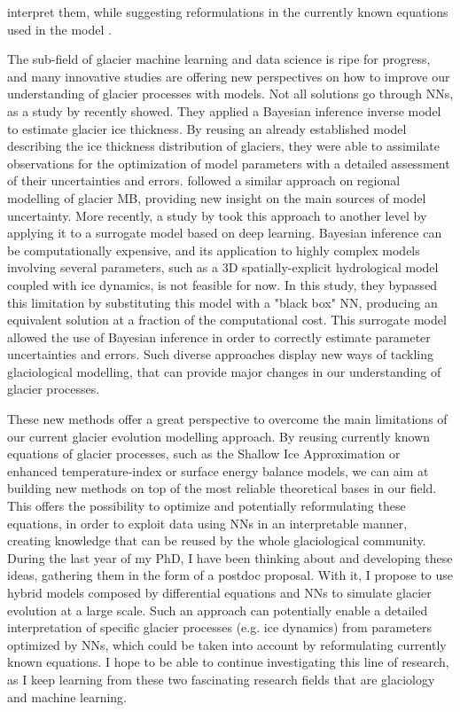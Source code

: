 interpret them, while suggesting reformulations in the currently known equations used in the model \citep{rackauckas_universal_2020}. 

The sub-field of glacier machine learning and data science is ripe for progress, and many innovative studies are offering new perspectives on how to improve our understanding of glacier processes with models. Not all solutions go through NNs, as a study by \citet{werder_bayesian_2019} recently showed. They applied a Bayesian inference inverse model to estimate glacier ice thickness. By reusing an already established model describing the ice thickness distribution of glaciers, they were able to assimilate observations for the optimization of model parameters with a detailed assessment of their uncertainties and errors. \citet{rounce_quantifying_2020} followed a similar approach on regional modelling of glacier MB, providing new insight on the main sources of model uncertainty. More recently, a study by \citet{brinkerhoff_constraining_2020} took this approach to another level by applying it to a surrogate model based on deep learning. Bayesian inference can be computationally expensive, and its application to highly complex models involving several parameters, such as a 3D spatially-explicit hydrological model coupled with ice dynamics, is not feasible for now. In this study, they bypassed this limitation by substituting this model with a "black box" NN, producing an equivalent solution at a fraction of the computational cost. This surrogate model allowed the use of Bayesian inference in order to correctly estimate parameter uncertainties and errors. Such diverse approaches display new ways of tackling glaciological modelling, that can provide major changes in our understanding of glacier processes. 

These new methods offer a great perspective to overcome the main limitations of our current glacier evolution modelling approach. By reusing currently known equations of glacier processes, such as the Shallow Ice Approximation \citep{hutter_theoretical_1983} or enhanced temperature-index or surface energy balance models, we can aim at building new methods on top of the most reliable theoretical bases in our field. This offers the possibility to optimize and potentially reformulating these equations, in order to exploit data using NNs in an interpretable manner, creating knowledge that can be reused by the whole glaciological community. During the last year of my PhD, I have been thinking about and developing these ideas, gathering them in the form of a postdoc proposal. With it, I propose to use hybrid models composed by differential equations and NNs to simulate glacier evolution at a large scale. Such an approach can potentially enable a detailed interpretation of specific glacier processes (e.g. ice dynamics) from parameters optimized by NNs, which could be taken into account by reformulating currently known equations. I hope to be able to continue investigating this line of research, as I keep learning from these two fascinating research fields that are glaciology and machine learning. 

